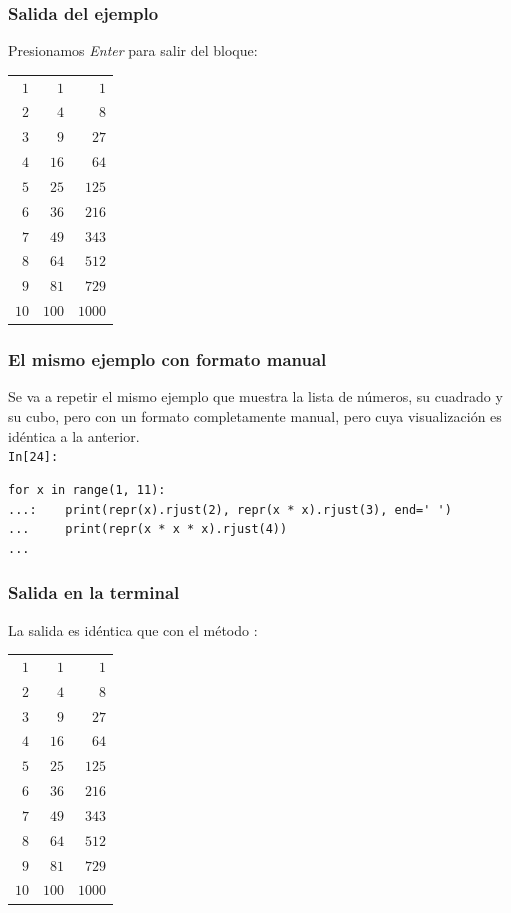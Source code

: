 \begin{frame}[fragile]
\frametitle{Salida del ejemplo}
Presionamos \emph{Enter} para salir del bloque:
\fontsize{10}{10}\selectfont
\begin{table}
\begin{tabular}{ r r r}
$1$ & $1$ &  $1$ \\
$2$ & $4$ &  $8$ \\
$3$ & $9$ &  $27$ \\
$4$ & $16$ & $64$\\
$5$ & $25$ & $125$ \\
$6$ & $36$ & $216$ \\
$7$ & $49$ & $343$ \\
$8$ & $64$ & $512$ \\
$9$ & $81$ & $729$ \\
$10$ & $100$ & $1000$
\end{tabular}
\end{table}  

\end{frame}
\begin{frame}[fragile]
\frametitle{El mismo ejemplo con formato manual}
Se va a repetir el mismo ejemplo que muestra la lista de números, su cuadrado y su cubo, pero con un formato completamente manual, pero cuya visualización es idéntica a la anterior.
\\
\bigskip
\pause
\fontsize{12}{12}\selectfont
\textcolor{ao}{\texttt{In[24]: }} 
\begin{lstlisting}
for x in range(1, 11):
...:    print(repr(x).rjust(2), repr(x * x).rjust(3), end=' ')
...     print(repr(x * x * x).rjust(4))
...
\end{lstlisting}
\end{frame}
\begin{frame}
\frametitle{Salida en la terminal}
{\fontsize{13}{13}\selectfont
La salida es idéntica que con el método : }
\fontsize{10}{10}\selectfont
\begin{table}
\begin{tabular}{ r r r}
$1$ & $1$ &  $1$ \\
$2$ & $4$ &  $8$ \\
$3$ & $9$ &  $27$ \\
$4$ & $16$ & $64$\\
$5$ & $25$ & $125$ \\
$6$ & $36$ & $216$ \\
$7$ & $49$ & $343$ \\
$8$ & $64$ & $512$ \\
$9$ & $81$ & $729$ \\
$10$ & $100$ & $1000$
\end{tabular}
\end{table}  
\end{frame}

